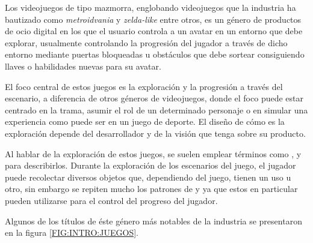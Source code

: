 Los videojuegos de tipo mazmorra, englobando videojuegos que la industria ha bautizado como \textit{metroidvania} y \textit{zelda-like} entre otros, es un género de productos de ocio digital en los que el usuario controla a un avatar en un entorno que debe explorar, usualmente controlando la progresión del jugador a través de dicho entorno mediante puertas bloqueadas u obstáculos que debe sortear consiguiendo llaves o habilidades nuevas para su avatar.

El foco central de estos juegos es la exploración y la progresión a través del escenario, a diferencia de otros géneros de videojuegos, donde el foco puede estar centrado en la trama, asumir el rol de un determinado personaje o en simular una experiencia como puede ser en un juego de deporte. El diseño de cómo es la exploración depende del desarrollador y de la visión que tenga sobre su producto.

Al hablar de la exploración de estos juegos, se suelen emplear términos como ,  y  para describirlos. Durante la exploración de los escenarios del juego, el jugador puede recolectar diversos objetos que, dependiendo del juego, tienen un uso u otro, sin embargo se repiten mucho los patrones de  y  ya que estos en particular pueden utilizarse para el control del progreso del jugador.

Algunos de los títulos de éste género más notables de la industria se presentaron en la figura \ref{FIG:INTRO:JUEGOS}.